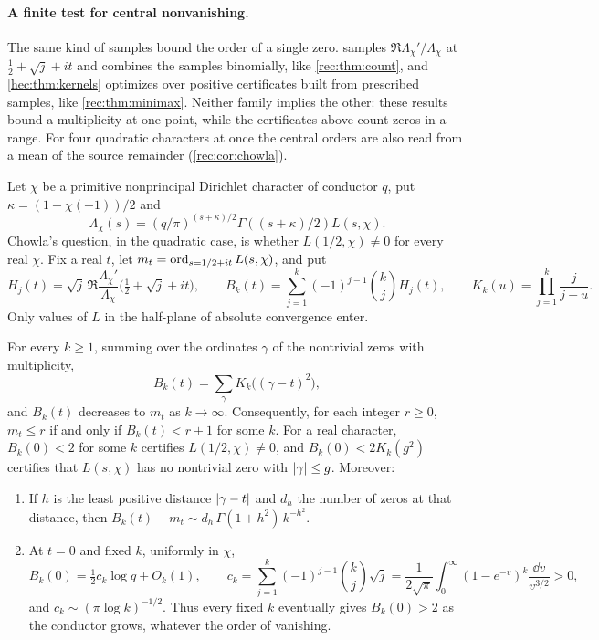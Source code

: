 \paragraph{A finite test for central nonvanishing.}
The same kind of samples bound the order of a single zero.  samples
$\Re\Lambda_\chi'/\Lambda_\chi$ at $\tfrac12+\sqrt j+it$ and combines the samples binomially, like
\cref{rec:thm:count}, and \cref{hec:thm:kernels} optimizes over positive certificates built from
prescribed samples, like \cref{rec:thm:minimax}. Neither family implies the other: these results bound a
multiplicity at one point, while the certificates above count zeros in a range. For four quadratic
characters at once the central orders are also read from a mean of the source remainder
(\cref{rec:cor:chowla}).

Let $\chi$ be a primitive nonprincipal Dirichlet character of conductor $q$, put
$\kappa=(1-\chi(-1))/2$ and
\[
 \Lambda_\chi(s)=(q/\pi)^{(s+\kappa)/2}\Gamma((s+\kappa)/2)L(s,\chi).
\]
Chowla's question, in the quadratic case, is whether $L(1/2,\chi)\ne0$ for every real $\chi$. Fix a real
$t$, let $m_t=\operatorname{ord}_{s=1/2+it}L(s,\chi)$, and put
\[
 H_j(t)=\sqrt j\,\Re\frac{\Lambda_\chi'}{\Lambda_\chi}\bigl(\tfrac12+\sqrt j+it\bigr),\qquad
 B_k(t)=\sum_{j=1}^k(-1)^{j-1}\binom kjH_j(t),\qquad
 K_k(u)=\prod_{j=1}^k\frac j{j+u}.
\]
Only values of $L$ in the half-plane of absolute convergence enter.

\begin{theorem}\label{hec:thm:chowla}
For every $k\ge1$, summing over the ordinates $\gamma$ of the nontrivial zeros with multiplicity,
\[
 B_k(t)=\sum_\gamma K_k\bigl((\gamma-t)^2\bigr),
\]
and $B_k(t)$ decreases to $m_t$ as $k\to\infty$. Consequently, for each integer $r\ge0$, $m_t\le r$ if and
only if $B_k(t)<r+1$ for some $k$. For a real character, $B_k(0)<2$ for some $k$ certifies
$L(1/2,\chi)\ne0$, and $B_k(0)<2K_k(g^2)$ certifies that $L(s,\chi)$ has no nontrivial zero with
$\lvert\gamma\rvert\le g$. Moreover:
\begin{enumerate}[label=\textup{(\roman*)}]
\item If $h$ is the least positive distance $\lvert\gamma-t\rvert$ and $d_h$ the number of zeros at that
distance, then $B_k(t)-m_t\sim d_h\,\Gamma(1+h^2)\,k^{-h^2}$.
\item At $t=0$ and fixed $k$, uniformly in $\chi$,
\[
 B_k(0)=\tfrac12c_k\log q+O_k(1),\qquad
 c_k=\sum_{j=1}^k(-1)^{j-1}\binom kj\sqrt j=\frac1{2\sqrt\pi}\int_0^\infty(1-e^{-v})^k\frac{\dd v}{v^{3/2}}>0,
\]
and $c_k\sim(\pi\log k)^{-1/2}$. Thus every fixed $k$ eventually gives $B_k(0)>2$ as the conductor grows,
whatever the order of vanishing.
\end{enumerate}
\end{theorem}

